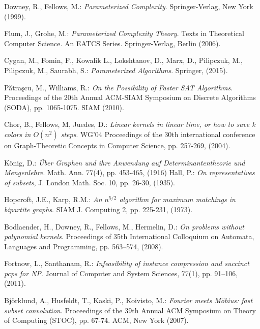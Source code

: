 \documentclass[en]{pracamgr}
\theoremstyle{definition}
\begin{document}
\begin{thebibliography}{99}

  Downey, R., Fellows, M.: \textit{Parameterized Complexity}. Springer-Verlag, New York (1999).

 Flum, J., Grohe, M.: \textit{Parameterized Complexity Theory}. Texts in Theoretical Computer Science. An EATCS Series. Springer-Verlag, Berlin (2006).

 Cygan, M., Fomin, F., Kowalik L., Lokshtanov, D., Marx, D., Pilipczuk, M., Pilipczuk, M., Saurabh, S.: \textit{Parameterized Algorithms}. Springer, (2015).

 Pătraşcu, M., Williams, R.: \textit{On the Possibility of Faster SAT Algorithms}. Proceedings of the 20th Annual ACM-SIAM Symposium on Discrete Algorithms (SODA), pp. 1065-1075. SIAM (2010).

 Chor, B., Fellows, M, Juedes, D.: \textit{Linear kernels in linear time, or how to save k colors in $O(n^2)$ steps}. WG'04 Proceedings of the 30th international conference on Graph-Theoretic Concepts in Computer Science, pp. 257-269, (2004).

 König, D.: \textit{Über Graphen und ihre Anwendung auf Determinantentheorie und Mengenlehre}. Math. Ann. 77(4), pp. 453-465, (1916)
 Hall, P.: \textit{On representatives of subsets}, J. London Math. Soc. 10, pp. 26-30, (1935).

 Hopcroft, J.E., Karp, R.M.: \textit{An $n^{5/2}$ algorithm for maximum matchings in bipartite graphs}. SIAM J. Computing 2, pp. 225-231, (1973).

 Bodlaender, H., Downey, R., Fellows, M., Hermelin, D.: \textit{On problems without polynomial kernels}. Proceedings of 35th International Colloquium on Automata, Languages and Programming, pp. 563–574, (2008).

 Fortnow, L., Santhanam, R.: \textit{Infeasibility of instance compression and succinct pcps for NP}. Journal of Computer and System Sciences, 77(1), pp. 91–106, (2011).

 Björklund, A., Husfeldt, T., Kaski, P., Koivisto, M.: \textit{Fourier meets Möbius: fast subset convolution}. Proceedings of the 39th Annual ACM Symposium on Theory of Computing (STOC), pp. 67-74. ACM, New York (2007).



\end{thebibliography}
\end{document}
